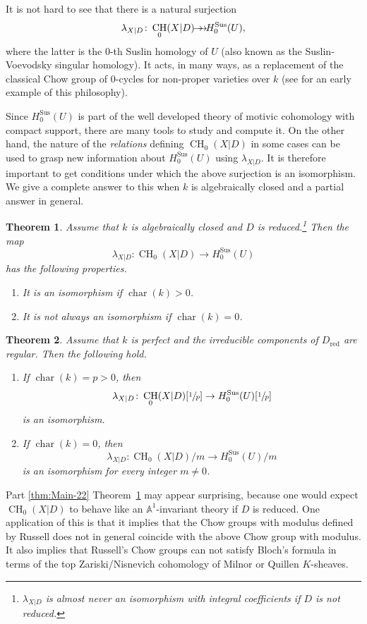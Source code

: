 \documentclass[JEP,XML,SOM,Unicode,published]{cedram}
\newcommand{\onto}{\mathchoice{\to\hspace*{-5mm}\to}{\hspace*{-.5mm}\to\hspace*{-2.85mm}\to\hspace*{-.5mm}}{\to\hspace*{-3mm}\to}{\to\hspace*{-3mm}\to}}
\let\surj\onto
\newcommand{\sus}{\mathrm{Sus}}
\newtheorem{thm}{Theorem}[section]
\theoremstyle{definition}
\newcommand{\thmref}{Theorem~\ref}
\newcommand{\A}{{\mathbb A}}
\DeclareMathOperator{\CH}{CH}
\DeclareMathOperator{\Char}{char}
\newcommand{\red}{\mathrm{red}}
\begin{document}
It is not hard to see that
there is a natural surjection
\[
\lambda_{X|D}\colon \CH_0(X|D) \surj H^{\sus}_0(U),
\]
where
the latter is the 0-th Suslin homology of $U$ (also known as the
Suslin-Voevodsky singular homology). It acts, in many ways, as a replacement of the
classical Chow group of $0$-cycles for non-proper varieties over $k$ (see \cite{SS} for
an early example of this philosophy).

Since $H^{\sus}_0(U)$ is part of the well developed theory of
motivic cohomology with compact support, there are many tools
to study and compute it. On the other hand, the nature of the \emph{relations}
defining $\CH_0(X|D)$ in some cases
can be used to grasp new information about $H^{\sus}_0(U)$ using $\lambda_{X|D}$.
It is therefore important to get conditions under which the above surjection is an
isomorphism.
We give a complete answer to this when $k$ is algebraically closed and
a partial answer in general.

\begin{thm}\label{thm:Main-2}
Assume that $k$ is algebraically closed and $D$ is
reduced.\footnote{$\lambda_{X|D}$ is almost never an
isomorphism with integral coefficients if $D$ is not reduced.} Then the map
\[
\lambda_{X|D} \colon \CH_0(X|D) \to H^{\sus}_0(U)
\]
has the following properties.
\begin{enumerate}
\item\label{thm:Main-21}
It is an isomorphism if $\Char(k) > 0$.
\item\label{thm:Main-22}
It is not always an isomorphism if $\Char(k) = 0$.
\end{enumerate}
\end{thm}

\begin{thm}\label{thm:Main-2-fin}
Assume that $k$ is perfect and the irreducible components of $D_\red$ are regular.
Then the following hold.
\begin{enumerate}
\item\label{thm:Main-2-fin1}
If $\Char(k) = p > 0$, then
\[
\lambda_{X|D} \colon \CH_0(X|D)[\sfrac{1}{p}] \to H^{\sus}_0(U)[\sfrac{1}{p}]
\]
is an isomorphism.
\item\label{thm:Main-2-fin2}
If $\Char(k) = 0$, then
\[
\lambda_{X|D} \colon {\CH_0(X|D)}/m \to {H^{\sus}_0(U)}/m
\]
is an isomorphism for every integer $m \neq 0$.
\end{enumerate}
\end{thm}

Part \eqref{thm:Main-22} \thmref{thm:Main-2} may appear surprising, because one would expect
$\CH_0(X|D)$ to behave like an $\A^1$-invariant theory if $D$ is reduced.
One application of this is that it implies that
the Chow groups with modulus defined by Russell \cite{RussellANT} does
not in general coincide with the above Chow group with modulus.
It also implies that Russell's Chow groups can not satisfy Bloch's formula
in terms of the top Zariski/Nisnevich cohomology of Milnor or Quillen
$K$-sheaves.
\end{document}
